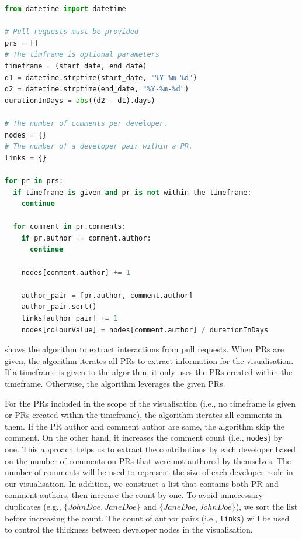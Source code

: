 \documentclass[sigconf]{acmart}
\begin{document}
\begin{minipage}{.95\linewidth}
\begin{lstlisting}[language=Python, caption=Algorithm to extract interactions, label=algorithm]
from datetime import datetime

# Pull requests must be provided
prs = []
# The timframe is optional parameters
timeframe = (start_date, end_date)
d1 = datetime.strptime(start_date, "%Y-%m-%d")
d2 = datetime.strptime(end_date, "%Y-%m-%d")
durationInDays = abs((d2 - d1).days)

# The number of comments per developer.
nodes = {}
# The number of a developer pair within a PR.
links = {} 

for pr in prs:
  if timeframe is given and pr is not within the timeframe:
    continue

  for comment in pr.comments:
    if pr.author == comment.author:
      continue

    nodes[comment.author] += 1

    author_pair = [pr.author, comment.author]
    author_pair.sort()
    links[author_pair] += 1
    nodes[colourValue] = nodes[comment.author] / durationInDays
\end{lstlisting}
\end{minipage}

 shows the algorithm to extract interactions from pull requests.
When PRs are given, the algorithm iterates all PRs to extract information for the visualisation.
If a timeframe is given to the algorithm, it only uses the PRs created within the timeframe.
Otherwise, the algorithm leverages the given PRs.

For the PRs included in the scope of the visualisation (i.e., no timeframe is given or PRs created within the timeframe), the algorithm iterates all comments in them.
If the PR author and comment author are same, the algorithm skip the comment.
On the other hand, it increases the comment count (i.e., {\tt nodes}) by one.
This approach helps us to extract the contributions by each developer based on the number of comments on PRs that were not authored by themselves.
The number of comments will be used to represent the size of each developer node in our visualisation.
In addition, we construct a list that contains both PR and comment authors, then increase the count by one.
To avoid unnecessary duplicates (e.g., $\{John Doe, Jane Doe\}$ and $\{Jane Doe, John Doe\}$), we sort the list before increasing the count.
The count of author pairs (i.e., {\tt links}) will be used to control the thickness between developer nodes in the visualisation.
\end{document}
